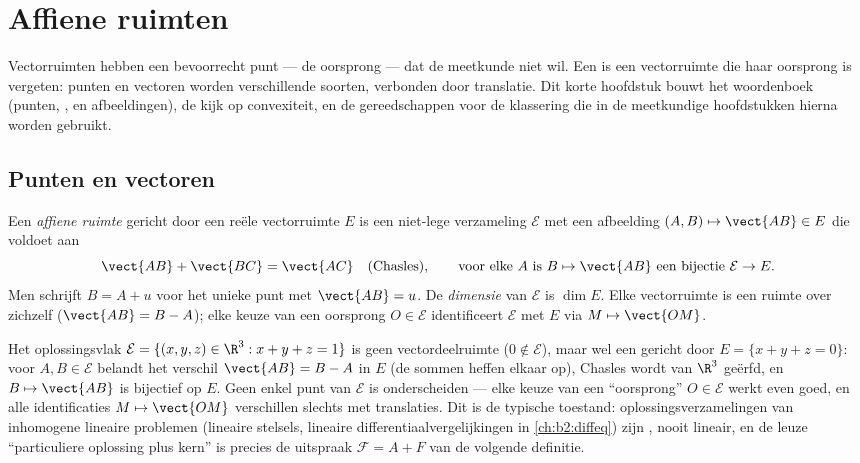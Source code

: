 \chapter{Affiene ruimten}\label{ch:b2:affine}

Vectorruimten hebben een bevoorrecht punt --- de oorsprong --- dat
de meetkunde niet wil. Een \emph{} is een vectorruimte
die haar oorsprong is vergeten: punten en vectoren worden
verschillende soorten, verbonden door translatie. Dit korte
hoofdstuk bouwt het woordenboek (punten, ,  en afbeeldingen), de  kijk op convexiteit, en de
gereedschappen voor de klassering die in de meetkundige
hoofdstukken hierna worden gebruikt.

\section{Punten en vectoren}

\begin{definition}\label{def:b2:affine:def}
Een \emph{affiene ruimte} gericht door een
reële vectorruimte $E$ is een niet-lege verzameling $\mathcal{E}$
met een afbeelding $(A, B) \mapsto \vect{AB} \in E$ die voldoet aan
\[
\vect{AB} + \vect{BC} = \vect{AC}
\quad \text{(Chasles)},
\qquad
\text{voor elke } A \text{ is } B \mapsto \vect{AB} \text{ een
bijectie } \mathcal{E} \to E .
\]
Men schrijft $B = A + u$ voor het unieke punt met $\vect{AB} = u$.
De \emph{dimensie} van $\mathcal{E}$ is $\dim E$. Elke vectorruimte
is een  ruimte over zichzelf ($\vect{AB} = B - A$); elke
keuze van een oorsprong $O \in \mathcal{E}$ identificeert
$\mathcal{E}$ met $E$ via $M \mapsto \vect{OM}$.
\end{definition}

\begin{example}\label{ex:b2:affine:planeexample}
Het oplossingsvlak $\mathcal E = \{(x, y, z) \in \R^3 : x + y + z =
1\}$ is geen vectordeelruimte ($0 \notin \mathcal E$), maar wel een
 gericht door $E = \{x + y + z = 0\}$: voor $A, B \in
\mathcal E$ belandt het verschil $\vect{AB} = B - A$ in $E$ (de
sommen heffen elkaar op), Chasles wordt van $\R^3$ geërfd, en $B
\mapsto \vect{AB}$ is bijectief op $E$. Geen enkel punt van
$\mathcal E$ is onderscheiden --- elke keuze van een ``oorsprong''
$O \in \mathcal E$ werkt even goed, en alle identificaties $M
\mapsto \vect{OM}$ verschillen slechts met translaties. Dit is de
typische toestand: oplossingsverzamelingen van inhomogene lineaire
problemen (lineaire stelsels, lineaire differentiaalvergelijkingen
in \cref{ch:b2:diffeq}) zijn , nooit lineair, en de leuze
``particuliere oplossing plus kern'' is precies de uitspraak
$\mathcal F = A + F$ van de volgende definitie.
\end{example}

